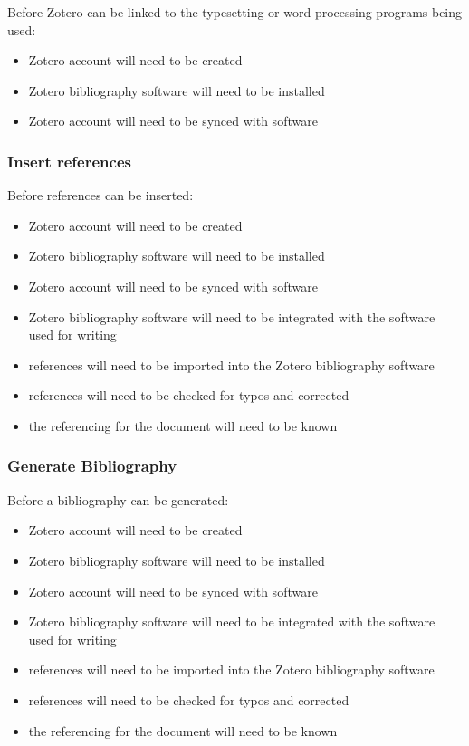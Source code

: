 \documentclass{article}
\begin{document}
Before Zotero can be linked to the typesetting or word processing programs being used:
\begin{itemize}
\item Zotero account will need to be created
    \item Zotero bibliography software will need to be installed
    \item Zotero account will need to be synced with software
\end{itemize}

\subsubsection*{Insert references}

Before references can be inserted:
\begin{itemize}
\item Zotero account will need to be created
    \item Zotero bibliography software will need to be installed
    \item Zotero account will need to be synced with software
    \item Zotero bibliography software will need to be integrated with the software used for writing
    \item references will need to be imported into the Zotero bibliography software
    \item references will need to be checked for typos and corrected
    \item the referencing for the document will need to be known
\end{itemize}

\subsubsection*{Generate Bibliography}

Before a bibliography can be generated:
\begin{itemize}
\item Zotero account will need to be created
    \item Zotero bibliography software will need to be installed
    \item Zotero account will need to be synced with software
    \item Zotero bibliography software will need to be integrated with the software used for writing
    \item references will need to be imported into the Zotero bibliography software
    \item references will need to be checked for typos and corrected
    \item the referencing for the document will need to be known
\end{itemize}
\end{document}
